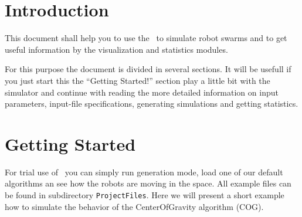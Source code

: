 \documentclass[a4paper,halfparskip,11pt,twoside]{scrartcl}
\begin{document}
\init{}


\section{Introduction}
This document shall help you to use the \RSS\ to simulate robot swarms and to get useful information by the visualization and statistics modules.

For this purpose the document is divided in several sections. It will be usefull if you just start this the ``Getting Started!'' section play a little bit with the simulator and continue with reading the more detailed information on input parameters, input-file specifications, generating simulations and getting statistics. 


\section{Getting Started}
For trial use of \RSS\ you can simply run generation mode, load one of our default algorithms an see how the robots are moving in the space. All example files can be found in subdirectory {\tt ProjectFiles}. Here we will present a short example how to simulate the behavior of the {\sc CenterOfGravity} algorithm (COG).
\end{document}
